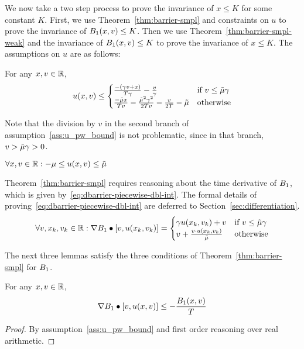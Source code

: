 We now take a two step process to prove the invariance of $x \leq K$ for
some constant $K$. First, we use Theorem~\ref{thm:barrier-smpl} and
constraints on $u$ to prove the invariance of $B_1 (x,v) \leq K$. Then we
use Theorem~\ref{thm:barrier-smpl-weak} and the invariance of $B_1 (x,v)
\leq K$ to prove the invariance of $x \leq K$. The assumptions on $u$ are
as follows:

\begin{assumption}
For any $x,v \in \mathbb{R}$,
\[
u(x,v) \leq
\begin{cases}
\frac{-(\gamma v + x)}{T\gamma} - \frac{v}{\gamma} & \text{if } v \leq \tilde{\mu}\gamma \\
\frac{-\tilde{\mu} x}{T v} - \frac{\tilde{\mu}^2 \gamma^2}{2Tv} - \frac{v}{2T} - \tilde{\mu} & \text{otherwise}
\end{cases}
\]
\label{ass:u_pw_bound}
\end{assumption}

Note that the division by $v$ in the second branch of
assumption~\ref{ass:u_pw_bound} is not problematic, since in that branch,
$v > \tilde{\mu}\gamma > 0$.

\begin{assumption}
$\forall x, v \in \mathbb{R} : -\mu \leq u(x,v) \leq \tilde{\mu}$
\label{ass:u_umax_bound}
\end{assumption}

Theorem~\ref{thm:barrier-smpl} requires reasoning about the time derivative
of $B_1$, which is given by~\eqref{eq:dbarrier-piecewise-dbl-int}. The
formal details of proving~\eqref{eq:dbarrier-piecewise-dbl-int} are
deferred to Section~\ref{sec:differentiation}.
\begin{equation}
\forall v, x_k, v_k \in \mathbb{R} : \nabla B_1 \bullet [v,u(x_k,v_k)] =
\begin{cases}
\gamma u(x_k,v_k) + v & \text{if } v \leq \tilde{\mu}\gamma \\
v + \frac{v\cdot u(x_k,v_k)}{\tilde{\mu}} & \text{otherwise}
\end{cases}
\label{eq:dbarrier-piecewise-dbl-int}
\end{equation}

The next three lemmas satisfy the three conditions of
Theorem~\ref{thm:barrier-smpl} for $B_1$.

\begin{lemma}
For any $x,v \in \mathbb{R}$,
\[
\nabla B_1 \bullet [v,u(x,v)] \leq -\frac{B_1 (x,v)}{T}
\]
\label{lem:exp-condition-dbl-int}
\end{lemma}
\begin{proof}
By assumption~\ref{ass:u_pw_bound} and first order reasoning over real arithmetic.
\end{proof}

